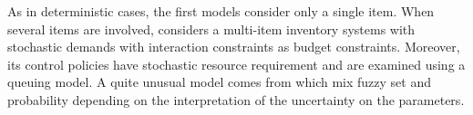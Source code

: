 \medskip


As in deterministic cases, the first models consider only a single item.
When several items are involved, \cite{Daeschner1975} considers a multi-item inventory systems with stochastic demands with interaction constraints as budget constraints.
Moreover, its control policies have stochastic resource requirement and are examined using a queuing model.
A quite unusual model comes from \cite{Panda2008} which mix fuzzy set and probability depending on the interpretation of the uncertainty on the parameters.


























